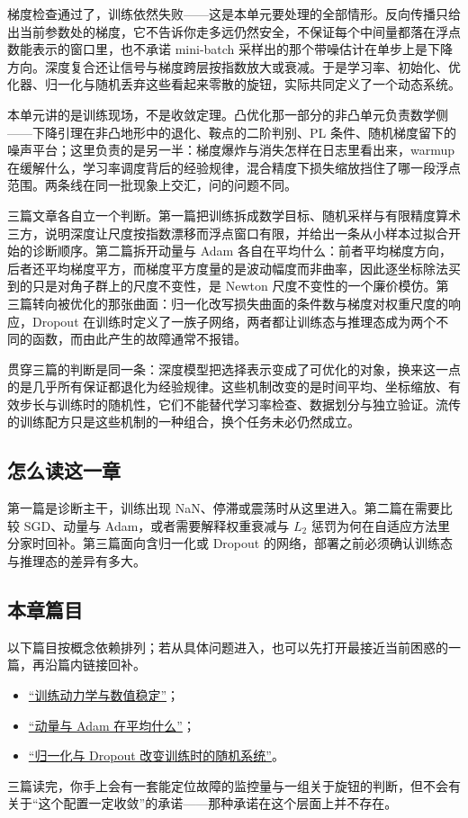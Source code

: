 梯度检查通过了，训练依然失败——这是本单元要处理的全部情形。反向传播只给出当前参数处的梯度，它不告诉你走多远仍然安全，不保证每个中间量都落在浮点数能表示的窗口里，也不承诺 mini-batch 采样出的那个带噪估计在单步上是下降方向。深度复合还让信号与梯度跨层按指数放大或衰减。于是学习率、初始化、优化器、归一化与随机丢弃这些看起来零散的旋钮，实际共同定义了一个动态系统。

本单元讲的是训练现场，不是收敛定理。凸优化那一部分的非凸单元负责数学侧——下降引理在非凸地形中的退化、鞍点的二阶判别、PL 条件、随机梯度留下的噪声平台；这里负责的是另一半：梯度爆炸与消失怎样在日志里看出来，warmup 在缓解什么，学习率调度背后的经验规律，混合精度下损失缩放挡住了哪一段浮点范围。两条线在同一批现象上交汇，问的问题不同。

三篇文章各自立一个判断。第一篇把训练拆成数学目标、随机采样与有限精度算术三方，说明深度让尺度按指数漂移而浮点窗口有限，并给出一条从小样本过拟合开始的诊断顺序。第二篇拆开动量与 Adam 各自在平均什么：前者平均梯度方向，后者还平均梯度平方，而梯度平方度量的是波动幅度而非曲率，因此逐坐标除法买到的只是对角子群上的尺度不变性，是 Newton 尺度不变性的一个廉价模仿。第三篇转向被优化的那张曲面：归一化改写损失曲面的条件数与梯度对权重尺度的响应，Dropout 在训练时定义了一族子网络，两者都让训练态与推理态成为两个不同的函数，而由此产生的故障通常不报错。

贯穿三篇的判断是同一条：深度模型把选择表示变成了可优化的对象，换来这一点的是几乎所有保证都退化为经验规律。这些机制改变的是时间平均、坐标缩放、有效步长与训练时的随机性，它们不能替代学习率检查、数据划分与独立验证。流传的训练配方只是这些机制的一种组合，换个任务未必仍然成立。

\subsection{怎么读这一章}

第一篇是诊断主干，训练出现 NaN、停滞或震荡时从这里进入。第二篇在需要比较 SGD、动量与 Adam，或者需要解释权重衰减与 \(L_2\) 惩罚为何在自适应方法里分家时回补。第三篇面向含归一化或 Dropout 的网络，部署之前必须确认训练态与推理态的差异有多大。

\subsection{本章篇目}

以下篇目按概念依赖排列；若从具体问题进入，也可以先打开最接近当前困惑的一篇，再沿篇内链接回补。

\begin{itemize}
\tightlist
\item \hyperref[sec:14-Deep-Learning/03-Optimization-and-Training/01]{``训练动力学与数值稳定''}；
\item \hyperref[sec:14-Deep-Learning/03-Optimization-and-Training/02]{``动量与 Adam 在平均什么''}；
\item \hyperref[sec:14-Deep-Learning/03-Optimization-and-Training/03]{``归一化与 Dropout 改变训练时的随机系统''}。
\end{itemize}

三篇读完，你手上会有一套能定位故障的监控量与一组关于旋钮的判断，但不会有关于``这个配置一定收敛''的承诺——那种承诺在这个层面上并不存在。
